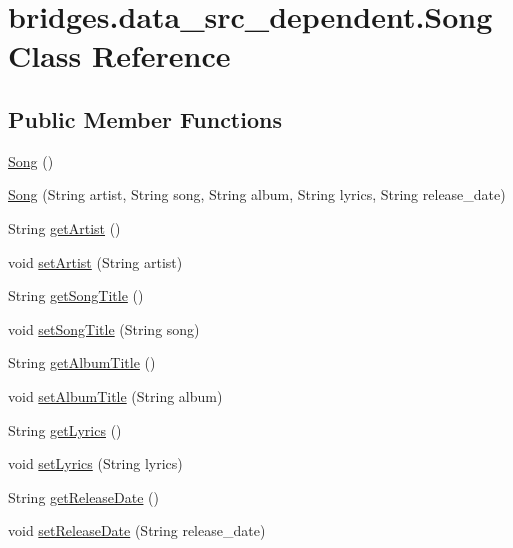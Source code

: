\hypertarget{classbridges_1_1data__src__dependent_1_1_song}{}\section{bridges.\+data\+\_\+src\+\_\+dependent.\+Song Class Reference}
\label{classbridges_1_1data__src__dependent_1_1_song}
\subsection*{Public Member Functions}
\begin{DoxyCompactItemize}
\item 
\hyperlink{classbridges_1_1data__src__dependent_1_1_song_a824052caca0b9c03d07c42e9e7740020}{Song} ()
\item 
\hyperlink{classbridges_1_1data__src__dependent_1_1_song_a78506e63f4d91dc1f0d821050a093ad6}{Song} (String artist, String song, String album, String lyrics, String release\+\_\+date)
\item 
String \hyperlink{classbridges_1_1data__src__dependent_1_1_song_a7aa3685df74e4fbb5e0d4d4750cf7685}{get\+Artist} ()
\item 
void \hyperlink{classbridges_1_1data__src__dependent_1_1_song_adffaec742bf945ec8c81244fdafd47d2}{set\+Artist} (String artist)
\item 
String \hyperlink{classbridges_1_1data__src__dependent_1_1_song_a4e7b8aed1aec243f2798a30e51091d72}{get\+Song\+Title} ()
\item 
void \hyperlink{classbridges_1_1data__src__dependent_1_1_song_a9d7540c0e6cca53ae3a105885aac5622}{set\+Song\+Title} (String song)
\item 
String \hyperlink{classbridges_1_1data__src__dependent_1_1_song_a94b26a355aa1e30938bcc896a8bd902f}{get\+Album\+Title} ()
\item 
void \hyperlink{classbridges_1_1data__src__dependent_1_1_song_ab9f9d24be49c3a0a66c9ff9e271b007e}{set\+Album\+Title} (String album)
\item 
String \hyperlink{classbridges_1_1data__src__dependent_1_1_song_ab4aa2c51f7fdce80d9c178d6f0e0aae8}{get\+Lyrics} ()
\item 
void \hyperlink{classbridges_1_1data__src__dependent_1_1_song_a30889eb971f474e9d62782ddb82c1846}{set\+Lyrics} (String lyrics)
\item 
String \hyperlink{classbridges_1_1data__src__dependent_1_1_song_a05520675a0a2f2e60583887b8c69cde4}{get\+Release\+Date} ()
\item 
void \hyperlink{classbridges_1_1data__src__dependent_1_1_song_a6534e543a295b29858cf98be7a4e276e}{set\+Release\+Date} (String release\+\_\+date)
\end{DoxyCompactItemize}


